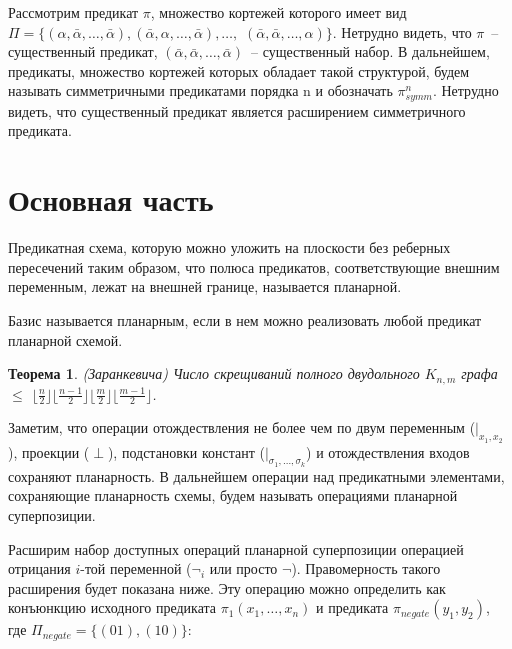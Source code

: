 \documentclass[12pt]{article}
\newtheorem{theorem}{Теорема}[section]
\newenvironment{definition}[1][Определение]{\begin{trivlist}
\item[\hskip \labelsep {\bfseries #1}]}{\end{trivlist}}
\begin{document}
\begin{definition}
Рассмотрим предикат 
$\pi$, множество кортежей которого имеет вид $\Pi = \{ (\alpha, \bar{\alpha}, \dots, \bar{\alpha}), (\bar{\alpha}, \alpha, \dots, \bar{\alpha}), \dots, $
$(\bar{\alpha}, \bar{\alpha}, \dots, \alpha) \}$. Нетрудно видеть, что $\pi$~-- существенный предикат, 
$(\bar{\alpha}, \bar{\alpha}, \dots, \bar{\alpha})$~-- существенный набор. 
В дальнейшем, предикаты, множество кортежей которых обладает такой структурой, будем называть 
симметричными предикатами порядка n и обозначать $\pi_{symm}^n$. Нетрудно видеть, что существенный предикат является 
расширением симметричного предиката.
\end{definition}

\clearpage
\section{Основная часть}


\begin{definition}
Предикатная схема, которую можно уложить на плоскости без реберных пересечений таким образом, что полюса предикатов, 
соответствующие внешним переменным, лежат на внешней границе, называется планарной. 
\end{definition}

\begin{definition}
Базис называется планарным, если в нем можно реализовать любой предикат планарной схемой.
\end{definition}

\begin{theorem}
\label{ZarankTheorem}
(Заранкевича) Число скрещиваний полного двудольного $K_{n,m}$ графа $\leq$
$\lfloor \frac{n}{2} \rfloor \lfloor \frac{n-1}{2} \rfloor \lfloor \frac{m}{2} \rfloor \lfloor \frac{m-1}{2} \rfloor$.
\cite{Zarank54}
\end{theorem}

Заметим, что операции отождествления не более чем по двум переменным ($|_{x_1, x_2}$), проекции ($\perp$),
подстановки констант ($|_{\sigma_1, \dots, \sigma_k}$) и отождествления входов сохраняют планарность.
В дальнейшем операции над предикатными элементами, сохраняющие планарность схемы,
будем называть операциями планарной суперпозиции.

Расширим набор доступных операций планарной суперпозиции операцией отрицания $i$-той переменной ($\neg_i$ или просто $\neg$). 
Правомерность такого расширения будет показана ниже.
Эту операцию можно определить как конъюнкцию исходного предиката $\pi_1(x_1, \dots, x_n)$ и предиката
$\pi_{negate}(y_1, y_2)$, где $\Pi_{negate} = \{ (01), (10) \}$:
\end{document}
